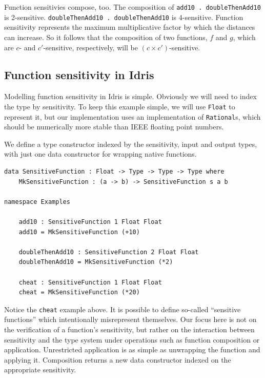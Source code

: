 \documentclass[12pt]{article}
\begin{document}
Function sensitivies compose, too.
The composition of \texttt{add10 . doubleThenAdd10} is 2-sensitive.
\texttt{doubleThenAdd10 . doubleThenAdd10} is 4-sensitive.
Function sensitivity represents the maximum multiplicative factor by which the distances can increase.
So it follows that the composition of two functions, $f$ and $g$, which are $c$- and $c'$-sensitive, respectively, will be $(c \times c')$-sensitive.


\subsection{Function sensitivity in Idris}

Modelling function sensitivity in Idris is simple.
Obviously we will need to index the type by sensitivity.
To keep this example simple, we will use \texttt{Float} to represent it, but our implementation uses an implementation of \texttt{Rational}s, which should be numerically more stable than IEEE floating point numbers.

We define a type constructor indexed by the sensitivity, input and output types, with just one data constructor for wrapping native functions.

\begin{lstlisting}
data SensitiveFunction : Float -> Type -> Type -> Type where
    MkSensitiveFunction : (a -> b) -> SensitiveFunction s a b

namespace Examples

    add10 : SensitiveFunction 1 Float Float
    add10 = MkSensitiveFunction (+10)

    doubleThenAdd10 : SensitiveFunction 2 Float Float
    doubleThenAdd10 = MkSensitiveFunction (*2)

    cheat : SensitiveFunction 1 Float Float
    cheat = MkSensitiveFunction (*20)
\end{lstlisting}

Notice the \texttt{cheat} example above.
It is possible to define so-called ``sensitive functions'' which intentionally misrepresent themselves.
Our focus here is not on the verification of a function's sensitivity, but rather on the interaction between sensitivity and the type system under operations such as function composition or application.
Unrestricted application is as simple as unwrapping the function and applying it.
Composition returns a new data constructor indexed on the appropriate sensitivity.
\end{document}
